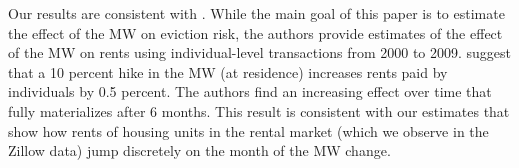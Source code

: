 Our results are consistent with \textcite{AgarwalEtAl2021}.
While the main goal of this paper is to estimate the effect of the MW on eviction
risk, the authors provide estimates of the effect of the MW on rents using
individual-level transactions from 2000 to 2009.
\textcite[][, Figure 4]{AgarwalEtAl2021} suggest that a 10 percent hike 
in the MW (at residence) increases rents paid by individuals by 0.5 percent.
The authors find an increasing effect over time that fully materializes after 
6 months.
This result is consistent with our estimates that show how rents of housing 
units in the rental market (which we observe in the Zillow data) jump 
discretely on the month of the MW change.
